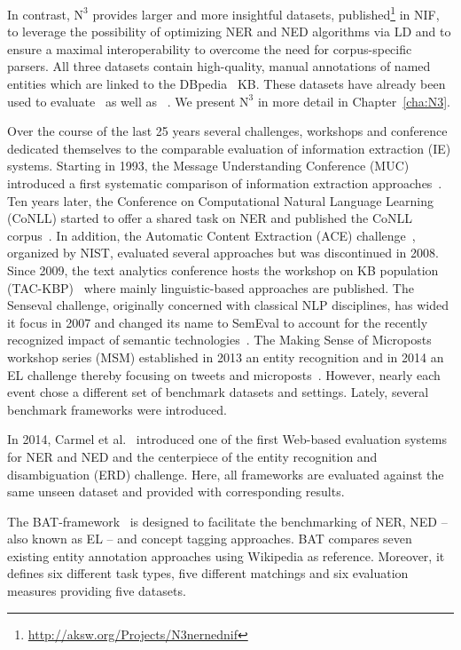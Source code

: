 In contrast,  $\mbox{N}^3$ provides larger and more insightful datasets, published\footnote{\url{http://aksw.org/Projects/N3nernednif}} in NIF, to leverage the possibility of optimizing NER and NED algorithms via \ac{LD} and to ensure a maximal interoperability to overcome the need for corpus-specific parsers. 
All three datasets contain high-quality, manual annotations of named entities which are linked to the DBpedia~\cite{dbpedia-swj} \ac{KB}.
These datasets have already been used to evaluate~\cite{AIDA,spotlight} as well as ~\cite{GER+13,agdistis_iswc,GERBIL}.
We present $\mbox{N}^3$ in more detail in Chapter~\ref{cha:N3}.


\bigskip

Over the course of the last 25 years several challenges, workshops and conference dedicated themselves to the comparable evaluation of information extraction (IE) systems. 
Starting in 1993, the Message Understanding Conference (MUC) introduced a first systematic comparison of information extraction approaches~\cite{Sundheim:1993:TIE:1072017.1072023}.
Ten years later, the Conference on Computational Natural Language Learning (CoNLL) started to offer a shared task on \ac{NER} and published the CoNLL corpus~\cite{conll2003}.
In addition, the Automatic Content Extraction (ACE) challenge~\cite{doddington2004automatic}, organized by NIST, evaluated several approaches but was discontinued in 2008. 
Since 2009, the text analytics conference hosts the workshop on \ac{KB} population (TAC-KBP)~\cite{mcnamee2009overview} where mainly linguistic-based approaches are published.
The Senseval challenge, originally concerned with classical NLP disciplines, has wided it focus in 2007 and changed its name to SemEval to account for the recently recognized impact of semantic technologies~\cite{kilgarri1998senseval}.
The Making Sense of Microposts workshop series (MSM) established in 2013 an entity recognition and in 2014 an \ac{EL} challenge thereby focusing on tweets and microposts~\cite{MSM2014}.
However, nearly each event chose a different set of benchmark datasets and settings. 
Lately, several benchmark frameworks were introduced.

In 2014, Carmel et al.~\cite{ERD2014} introduced one of the first Web-based evaluation systems for NER and NED and the centerpiece of the entity recognition and disambiguation (ERD) challenge. Here, all frameworks are evaluated against the same unseen dataset and provided with corresponding results. 

The BAT-framework~\cite{cornolti} is designed to facilitate the benchmarking of \ac{NER}, \ac{NED} -- also known as \ac{EL} -- and concept tagging approaches.
BAT compares seven existing entity annotation approaches using Wikipedia as reference.
Moreover, it defines six different task types, five different matchings and six evaluation measures providing five datasets.


